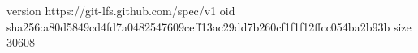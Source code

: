 version https://git-lfs.github.com/spec/v1
oid sha256:a80d5849cd4fd7a0482547609ceff13ac29dd7b260cf1f1f12ffcc054ba2b93b
size 30608
